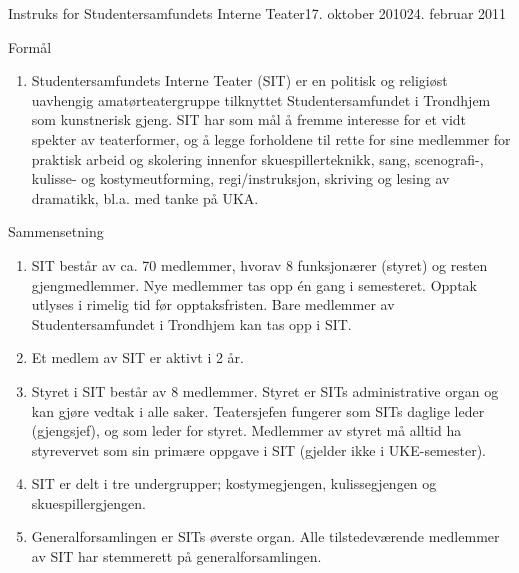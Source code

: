 \begin{instruks}{Instruks for Studentersamfundets Interne Teater}{17. oktober 2010}{24. februar 2011 }

	\begin{instruksledd}{Formål}
		\begin{enumerate}
			\item Studentersamfundets Interne Teater (SIT) er en politisk og religiøst uavhengig
				amatørteatergruppe tilknyttet Studentersamfundet i Trondhjem som kunstnerisk gjeng. SIT har som mål
				å fremme interesse for et vidt spekter av teaterformer, og å legge forholdene til rette for sine
				medlemmer for praktisk arbeid og skolering innenfor skuespillerteknikk, sang, scenografi-, kulisse-
				og kostymeutforming, regi/instruksjon, skriving og lesing av dramatikk, bl.a. med tanke på UKA.
		\end{enumerate}
	\end{instruksledd}

	\begin{instruksledd}{Sammensetning}
		\begin{enumerate}
			\item SIT består av ca. 70 medlemmer, hvorav 8 funksjonærer (styret) og resten
				gjengmedlemmer. Nye medlemmer tas opp én gang i semesteret. Opptak utlyses i rimelig tid før
				opptaksfristen. Bare medlemmer av Studentersamfundet i Trondhjem kan tas opp i SIT.
			\item Et medlem av SIT er aktivt i 2 år.
			\item Styret i SIT består av 8 medlemmer. Styret er SITs administrative organ og kan
				gjøre vedtak i alle saker. Teatersjefen fungerer som SITs daglige leder (gjengsjef), og som leder
				for styret. Medlemmer av styret må alltid ha styrevervet som sin primære oppgave i SIT (gjelder ikke
				i UKE-semester).
			\item SIT er delt i tre undergrupper; kostymegjengen, kulissegjengen og
				skuespillergjengen.
			\item  Generalforsamlingen er SITs øverste organ. Alle tilstedeværende medlemmer
				av SIT har stemmerett på generalforsamlingen.
		\end{enumerate}
	\end{instruksledd}


\end{instruks}

